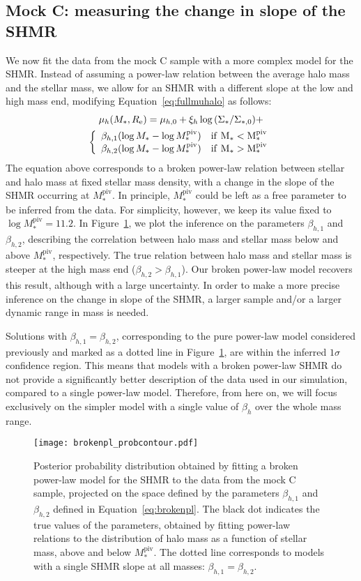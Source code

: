 \documentclass[usenatbib]{mnras}
\def\mstar{M_*}
\def\mpiv{M_*^{\mathrm{piv}}}
\def\reff{R_{\mathrm{e}}}
\def\Fref#1{Figure~\ref{#1}\xspace}
\def\Eref#1{Equation~\ref{#1}\xspace}
\begin{document}
\subsection{Mock C: measuring the change in slope of the SHMR}\label{ssec:brokenpl}

We now fit the data from the mock C sample with a more complex model for the SHMR.
Instead of assuming a power-law relation between the average halo mass and the stellar mass, we allow for an SHMR with a different slope at the low and high mass end, modifying \Eref{eq:fullmuhalo} as follows: 
\begin{multline}\label{eq:brokenpl}
\mu_h(\mstar, \reff) = \mu_{h,0} + \xi_h\log{(\Sigma_*/\Sigma_{*,0})} + \\
\left\{ \begin{array}{ll} \beta_{h,1}(\log{\mstar} - \log{\mpiv}) & \rm{if}\,\,\mstar < \mpiv \\
\beta_{h,2}(\log{\mstar} - \log{\mpiv}) & \rm{if}\,\, \mstar > \mpiv \end{array} \right.
\end{multline}
The equation above corresponds to a broken power-law relation between stellar and halo mass at fixed stellar mass density, with a change in the slope of the SHMR occurring at $\mpiv$.
In principle, $\mpiv$ could be left as a free parameter to be inferred from the data.
For simplicity, however, we keep its value fixed to $\log{\mpiv} = 11.2$. 
In \Fref{fig:brokenpl}, we plot the inference on the parameters $\beta_{h,1}$ and $\beta_{h,2}$, describing the correlation between halo mass and stellar mass below and above $\mpiv$, respectively. The true relation between halo mass and stellar mass is steeper at the high mass end ($\beta_{h,2} > \beta_{h, 1}$). Our broken power-law model recovers this result, although with a large uncertainty. In order to make a more precise inference on the change in slope of the SHMR, a larger sample and/or a larger dynamic range in mass is needed.

Solutions with $\beta_{h,1} = \beta_{h,2}$, corresponding to the pure power-law model considered previously and marked as a dotted line in \Fref{fig:brokenpl}, are within the inferred $1\sigma$ confidence region. This means that models with a broken power-law SHMR do not provide a significantly better description of the data used in our simulation, compared to a single power-law model. Therefore, from here on, we will focus exclusively on the simpler model with a single value of $\beta_h$ over the whole mass range.
%
\begin{figure}
\texttt{[image: brokenpl\_probcontour.pdf]}
\caption{Posterior probability distribution obtained by fitting a broken power-law model for the SHMR to the data from the mock C sample, projected on the space defined by the parameters $\beta_{h,1}$ and $\beta_{h,2}$ defined in \Eref{eq:brokenpl}.
The black dot indicates the true values of the parameters, obtained by fitting power-law relations to the distribution of halo mass as a function of stellar mass, above and below $\mpiv$.
The dotted line corresponds to models with a single SHMR slope at all masses: $\beta_{h,1}=\beta_{h,2}$.
}
\label{fig:brokenpl}
\end{figure}
\end{document}
